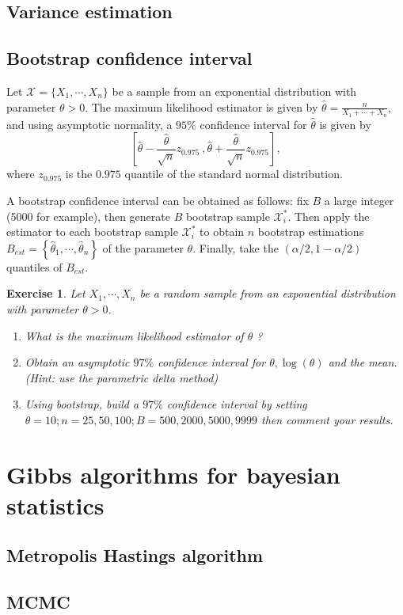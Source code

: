 \documentclass{article}\usepackage[]{graphicx}\usepackage[]{xcolor}
\newtheorem{exercise}{Exercise}
\begin{document}
\subsection{Variance estimation}

\subsection{Bootstrap confidence interval}

Let $\mathcal{X} = \lbrace X_1, \cdots, X_n\rbrace$ be a sample from an exponential distribution with parameter $\theta>0$. The maximum likelihood estimator is given by $\hat{\theta} = \frac{n}{X_1+\cdots + X_n},$ and using asymptotic normality, a $95\%$ confidence interval for $\hat{\theta}$ is given by 
\begin{equation}\label{Asymptotic normality Confidence interval}
\left[\hat{\theta}-\frac{\hat{\theta}}{\sqrt{n}}z_{0.975}~, \hat{\theta}+\frac{\hat{\theta}}{\sqrt{n}}z_{0.975}\right],
\end{equation}
where $z_{0.975}$ is the $0.975$ quantile of the standard normal distribution.

A bootstrap confidence interval can be obtained as follows: fix $B$ a large integer (5000 for example), then generate $B$ bootstrap sample $\mathcal{X}_i^*$. Then apply the estimator to each bootstrap sample $\mathcal{X}_i^*$ to obtain $n$ bootstrap estimations $B_{est}=\left\lbrace\hat{\theta}_1, \cdots, \hat{\theta}_n \right\rbrace$ of the parameter $\theta$. Finally, take the $(\alpha/2, 1-\alpha/2)$ quantiles of $B_{est}$.

\begin{exercise}
Let $X_1,\cdots, X_n$ be a random sample from an exponential distribution with parameter $\theta > 0$.
\begin{enumerate}
\item What is the maximum likelihood estimator of $\theta$ ? 
\item Obtain an asymptotic $97\%$ confidence interval for $\theta, \log(\theta)$ and the mean. (Hint: use the parametric delta method) 
\item Using bootstrap, build a $97\%$ confidence interval by setting $\theta = 10; n = 25, 50, 100; B = 500, 2000, 5000, 9999$ then comment your results. 
\end{enumerate}
\end{exercise}



\newpage
\section{Gibbs algorithms for bayesian statistics}

\subsection{Metropolis Hastings algorithm}

\subsection{MCMC}


\newpage



\end{document}
